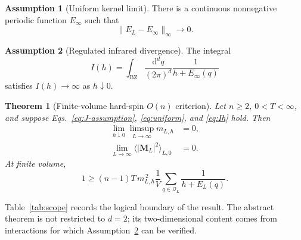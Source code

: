 \documentclass[aps,prb,twocolumn,groupedaddress,amsmath,amssymb,
               superscriptaddress,nofootinbib,floatfix]{revtex4-2}
\theoremstyle{plain}
\newtheorem{theorem}{Theorem}
\theoremstyle{definition}
\newtheorem{assumption}{Assumption}
\newcommand{\BZ}{\mathrm{BZ}}
\newcommand{\dd}{\mathrm{d}}
\begin{document}
\begin{assumption}[Uniform kernel limit]
\label{ass:uniform}
There is a continuous nonnegative periodic function $E_\infty$ such that
\begin{equation}
 \|E_L-E_\infty\|_\infty\longrightarrow0.              \label{eq:uniform}
\end{equation}
\end{assumption}

\begin{assumption}[Regulated infrared divergence]
\label{ass:ir}
The integral
\begin{equation}
 I(h)=\int_{\BZ}\frac{\dd^dq}{(2\pi)^d}
 \frac1{h+E_\infty(q)}                                 \label{eq:Ih}
\end{equation}
satisfies $I(h)\to\infty$ as $h\downarrow0$.
\end{assumption}

\begin{theorem}[Finite-volume hard-spin $O(n)$ criterion]
\label{thm:main}
Let $n\ge2$, $0<T<\infty$, and suppose
Eqs.~\eqref{eq:J-assumption}, \eqref{eq:uniform}, and
\eqref{eq:Ih} hold.  Then
\begin{align}
 \lim_{h\downarrow0}\limsup_{L\to\infty}m_{L,h}&=0,
                                                               \label{eq:field-result}\\
 \lim_{L\to\infty}
 \langle|\bm M_L|^2\rangle_{L,0}&=0.                  \label{eq:zero-result}
\end{align}
At finite volume,
\begin{equation}
 1\ge
 (n-1)T\,m_{L,h}^{\,2}
 \frac1V\sum_{q\in\mathcal Q_L}
 \frac1{h+E_L(q)}.                                     \label{eq:master-bound}
\end{equation}
\end{theorem}

Table~\ref{tab:scope} records the logical boundary of the result.  The
abstract theorem is not restricted to $d=2$; its two-dimensional content
comes from interactions for which Assumption~\ref{ass:ir} can be verified.
\end{document}
